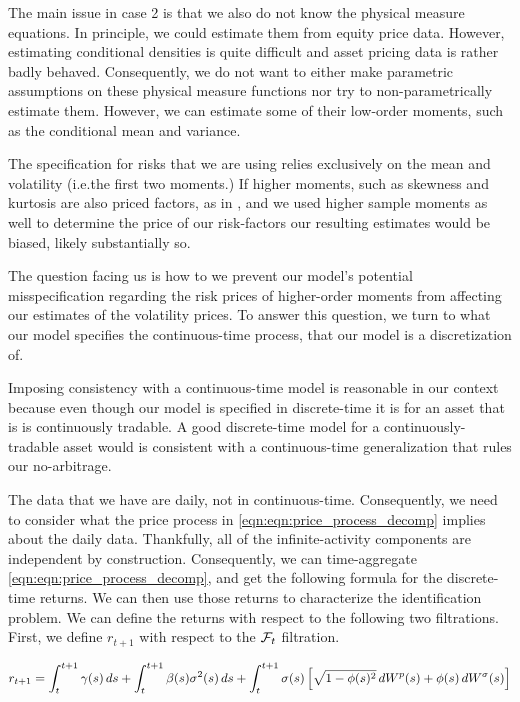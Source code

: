 \documentclass[11pt, letterpaper, twoside, final]{article}
\begin{document}
The main issue in case 2 is that we also do not know the physical measure equations.
In principle, we could estimate them from equity price data.
However, estimating conditional densities is quite difficult and asset pricing data is rather badly behaved.
Consequently, we do not want to either make parametric assumptions on these physical measure functions nor try to
non-parametrically estimate them.
However, we can estimate some of their low-order moments, such as the conditional mean and variance.

The specification for risks that we are using relies exclusively on the mean and volatility (i.e.\@ the first two
moments.)
If higher moments, such as skewness and kurtosis are also priced factors, as in \textcites{harvey2000conditional,
conrad2012exante, chang2013market},  and we used higher sample moments as well to determine the price of our
risk-factors our resulting estimates would be biased, likely substantially so. 

The question facing us is how to we prevent our model's potential misspecification regarding the risk prices of
higher-order moments from affecting our estimates of the volatility prices.
To answer this question, we turn to what our model specifies the continuous-time process, that our model is a
discretization of.

Imposing consistency with a continuous-time model is reasonable in our context because even though our model is
specified in discrete-time it is for an asset that is is continuously tradable.
A good discrete-time model for a continuously-tradable asset would is consistent with a continuous-time
generalization that rules our no-arbitrage.

The data that we have are daily, not in continuous-time. 
Consequently, we need to consider what the price process in  \cref{eqn:eqn:price_process_decomp} implies about the
daily data.
Thankfully, all of the infinite-activity components are independent by construction.
Consequently, we can time-aggregate \cref{eqn:eqn:price_process_decomp}, and get the following formula for the
discrete-time returns.  
We can then use those returns to characterize the identification problem.
We can define the returns with respect to the following two filtrations.
First, we define $r_{t+1}$ with respect to the $\mathcal{F}_{t}$ filtration.

\begin{equation}
    \label{eqn:discrete_time_rtn}
    r_{t+1} = \int_t^{t+1} \gamma(s) \mathop{}\!d s + \int_{t}^{t+1} \beta(s) \sigma^2(s) \mathop{}\!d s +
    \int_t^{t+1} \sigma(s) \left[\sqrt{1 - \phi(s)^2} \mathop{}\!d W^{p}(s) + \phi(s) \mathop{}\!d W^{\sigma}(s)\right]
\end{equation}
\end{document}
